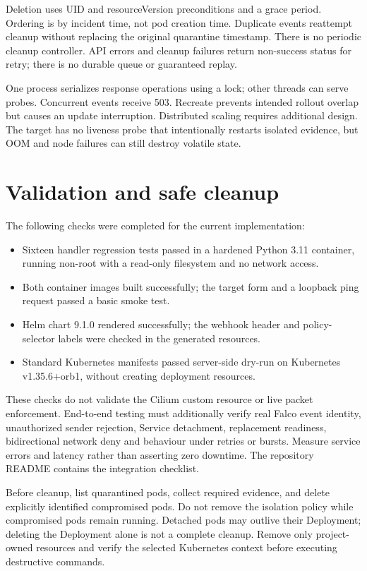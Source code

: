 Deletion uses UID and resourceVersion preconditions and a grace period. Ordering is
by incident time, not pod creation time. Duplicate events reattempt cleanup without
replacing the original quarantine timestamp. There is no periodic cleanup controller.
API errors and cleanup failures return non-success status for retry; there is no
durable queue or guaranteed replay.

One process serializes response operations using a lock; other threads can serve
probes. Concurrent events receive 503. Recreate prevents intended rollout overlap
but causes an update interruption. Distributed scaling requires additional design.
The target has no liveness probe that intentionally restarts isolated evidence, but
OOM and node failures can still destroy volatile state.

\section{Validation and safe cleanup}

The following checks were completed for the current implementation:
\begin{itemize}
\item Sixteen handler regression tests passed in a hardened Python 3.11 container,
running non-root with a read-only filesystem and no network access.
\item Both container images built successfully; the target form and a loopback ping
request passed a basic smoke test.
\item Helm chart 9.1.0 rendered successfully; the webhook header and policy-selector
labels were checked in the generated resources.
\item Standard Kubernetes manifests passed server-side dry-run on Kubernetes
v1.35.6+orb1, without creating deployment resources.
\end{itemize}
These checks do not validate the Cilium custom resource or live packet enforcement.
End-to-end testing must additionally verify real Falco event identity, unauthorized
sender rejection, Service detachment, replacement readiness, bidirectional network
deny and behaviour under retries or bursts. Measure service errors and latency rather
than asserting zero downtime. The repository README contains the integration checklist.

Before cleanup, list quarantined pods, collect required evidence, and delete explicitly
identified compromised pods. Do not remove the isolation policy while compromised
pods remain running. Detached pods may outlive their Deployment; deleting the
Deployment alone is not a complete cleanup. Remove only project-owned resources and
verify the selected Kubernetes context before executing destructive commands.
